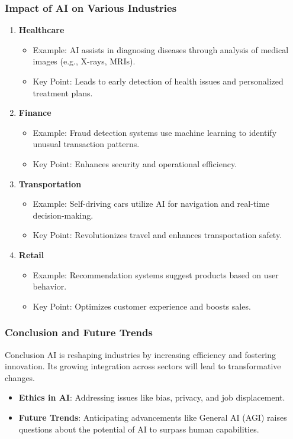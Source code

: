 \documentclass[aspectratio=169]{beamer}
\begin{document}
\begin{frame}[fragile]
    \frametitle{Impact of AI on Various Industries}
    \begin{enumerate}
        \item \textbf{Healthcare}
            \begin{itemize}
                \item Example: AI assists in diagnosing diseases through analysis of medical images (e.g., X-rays, MRIs).
                \item Key Point: Leads to early detection of health issues and personalized treatment plans.
            \end{itemize}
        \item \textbf{Finance}
            \begin{itemize}
                \item Example: Fraud detection systems use machine learning to identify unusual transaction patterns.
                \item Key Point: Enhances security and operational efficiency.
            \end{itemize}
        \item \textbf{Transportation}
            \begin{itemize}
                \item Example: Self-driving cars utilize AI for navigation and real-time decision-making.
                \item Key Point: Revolutionizes travel and enhances transportation safety.
            \end{itemize}
        \item \textbf{Retail}
            \begin{itemize}
                \item Example: Recommendation systems suggest products based on user behavior.
                \item Key Point: Optimizes customer experience and boosts sales.
            \end{itemize}
    \end{enumerate}
\end{frame}

\begin{frame}[fragile]
    \frametitle{Conclusion and Future Trends}
    \begin{block}{Conclusion}
        AI is reshaping industries by increasing efficiency and fostering innovation. Its growing integration across sectors will lead to transformative changes.
    \end{block}
    \begin{itemize}
        \item \textbf{Ethics in AI}: Addressing issues like bias, privacy, and job displacement.
        \item \textbf{Future Trends}: Anticipating advancements like General AI (AGI) raises questions about the potential of AI to surpass human capabilities.
    \end{itemize}
\end{frame}
\end{document}
